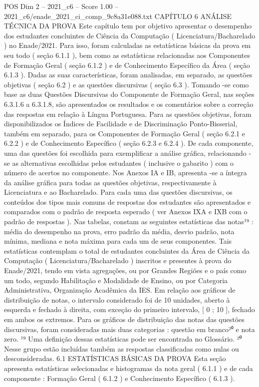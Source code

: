 \begin{textsample}{POS Dim 2 – 2021\_c6 – Score 1.00 – 2021\_c6/enade\_2021\_ci\_comp\_9c8a31e088.txt}  \label{ex:f2_pos_178}
CAPÍTULO 6 ANÁLISE TÉCNICA DA PROVA Este capítulo tem por objetivo apresentar o desempenho dos estudantes concluintes de Ciência da Computação ( Licenciatura/Bacharelado ) no Enade/2021.
Para isso, foram calculadas as estatísticas básicas da prova em seu todo ( seção 6.1.1 ), bem como as estatísticas relacionadas aos Componentes de Formação Geral ( seção 6.1.2 ) e de Conhecimento Específico da Área ( seção 6.1.3 ).
Dadas as suas características, foram analisadas, em separado, as questões objetivas ( seção 6.2 ) e as questões discursivas ( seção 6.3 ).
Tomando -se como base as duas Questões Discursivas do Componente de Formação Geral, nas seções 6.3.1.6 a 6.3.1.8, são apresentados os resultados e os comentários sobre a correção das respostas em relação à Língua Portuguesa.
Para as questões objetivas, foram disponibilizados os Índices de Facilidade e de Discriminação Ponto-Bisserial, também em separado, para os Componentes de Formação Geral ( seção 6.2.1 e 6.2.2 ) e de Conhecimento Específico ( seção 6.2.3 e 6.2.4 ).
De cada componente, uma das questões foi escolhida para exemplificar a análise gráfica, relacionando -se as alternativas escolhidas pelos estudantes ( inclusive o gabarito ) com o número de acertos no componente.
Nos Anexos IA e IB, apresenta -se a íntegra da análise gráfica para todas as questões objetivas, respectivamente à Licenciatura e ao Bacharelado.
Para cada uma das questões discursivas, os conteúdos dos tipos mais comuns de respostas dos estudantes são apresentados e comparados com o padrão de resposta esperado ( ver Anexos IXA e IXB com o padrão de respostas ).
Nas tabelas, constam as seguintes estatísticas das notas¹⁹ : média do desempenho na prova, erro padrão da média, desvio padrão, nota mínima, mediana e nota máxima para cada um de seus componentes.
Tais estatísticas contemplam o total de estudantes concluintes da Área de Ciência da Computação ( Licenciatura/Bacharelado ) inscritos e presentes à prova do Enade/2021, tendo em vista agregações, ou por Grandes Regiões e o país como um todo, segundo Habilitação e Modalidade de Ensino, ou por Categoria Administrativa, Organização Acadêmica da IES.
Em relação aos gráficos de distribuição de notas, o intervalo considerado foi de 10 unidades, aberto à esquerda e fechado à direita, com exceção do primeiro intervalo, [ 0 ; 10 ], fechado em ambos os extremos.
Para os gráficos de distribuição das notas das questões discursivas, foram consideradas mais duas categorias : questão em branco²⁰ e nota zero. ¹⁹ Uma definição dessas estatísticas pode ser encontrada no Glossário. ²⁰ Nesse grupo estão incluídas também as respostas classificadas como nulas ou desconsideradas. 6.1 ESTATÍSTICAS BÁSICAS DA PROVA Esta seção apresenta estatísticas selecionadas e histogramas da nota geral ( 6.1.1 ) e de cada componente : Formação Geral ( 6.1.2 ) e Conhecimento Específico ( 6.1.3 ).

\end{textsample}
